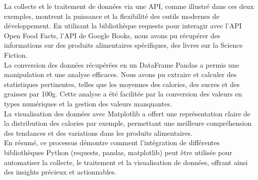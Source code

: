\documentclass[a4paper,11pt]{article}
\begin{document}
            \begin{figure}[ht]
            \end{figure}
            
            \begin{tcolorbox}[colback=lightgray!6, colframe=black, left=5mm, right=5mm, top=2mm, bottom=2mm, boxrule=0.1mm]
                La collecte et le traitement de données via une API, comme illustré dans ces deux exemples, montrent la puissance et la flexibilité des outils modernes de développement. En utilisant la bibliothèque requests pour interagir avec l'API Open Food Facts, l'API de Google Books, nous avons pu récupérer des informations sur des produits alimentaires spécifiques, des livres sur la Science Fiction.\\

                La conversion des données récupérées en un DataFrame Pandas a permis une manipulation et une analyse efficaces. Nous avons pu extraire et calculer des statistiques pertinentes, telles que les moyennes des calories, des sucres et des graisses par 100g. Cette analyse a été facilitée par la conversion des valeurs en types numériques et la gestion des valeurs manquantes.\\

                La visualisation des données avec Matplotlib a offert une représentation claire de la distribution des calories par exemple, permettant une meilleure compréhension des tendances et des variations dans les produits alimentaires.\\

                En résumé, ce processus démontre comment l'intégration de différentes bibliothèques Python (requests, pandas, matplotlib) peut être utilisée pour automatiser la collecte, le traitement et la visualisation de données, offrant ainsi des insights précieux et actionnables.
            \end{tcolorbox}
        
\end{document}
